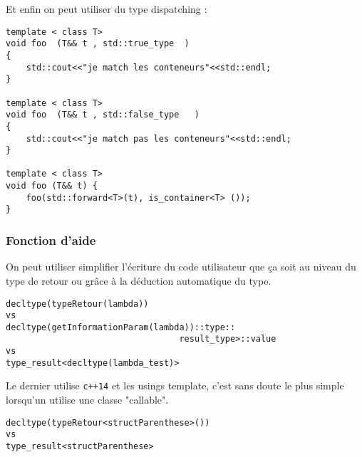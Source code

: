 \documentclass{beamer}
\begin{document}
\begin{frame}[containsverbatim]
Et enfin on peut utiliser du type dispatching :
	\begin{lstlisting}
template < class T>
void foo  (T&& t , std::true_type  )
{
    std::cout<<"je match les conteneurs"<<std::endl;
}

template < class T>
void foo  (T&& t , std::false_type   )
{
    std::cout<<"je match pas les conteneurs"<<std::endl;
}

template < class T>
void foo (T&& t) {
    foo(std::forward<T>(t), is_container<T> ()); 
}
	\end{lstlisting}

\end{frame}

\begin{frame}[containsverbatim]
	\frametitle{Fonction d'aide}
	On peut utiliser simplifier l’écriture du code utilisateur que ça soit au niveau du type de retour ou grâce à la déduction automatique du type.
	\begin{lstlisting}
decltype(typeRetour(lambda))
vs
decltype(getInformationParam(lambda))::type::
                                  result_type>::value
vs
type_result<decltype(lambda_test)> 
	\end{lstlisting}
Le dernier utilise \texttt{c++14} et les usings template, c'est sans doute le plus simple lorsqu'un utilise une classe "callable".
	\begin{lstlisting}
decltype(typeRetour<structParenthese>())
vs
type_result<structParenthese>  
	\end{lstlisting}

\end{frame}
\end{document}
